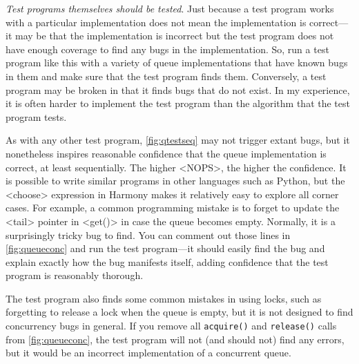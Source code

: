 \documentclass{report}
\begin{document}
\emph{Test programs themselves should be tested}.
Just because a test program works with a particular implementation
does not mean the implementation is correct---it may be that the implementation
is incorrect but the test program does not have enough coverage to find any
bugs in the implementation.
So, run a test program like this with a variety of queue implementations that
have known bugs in them and make sure that the test program finds them.
Conversely, a test program may be broken in that it finds bugs that do not exist.
In my experience, it is often harder to implement the test program than
the algorithm that the test program tests.

As with any other test program,
\autoref{fig:qtestseq} may not trigger extant bugs, but
it nonetheless inspires reasonable confidence that the
queue implementation is correct, at least sequentially.
The higher <{NOPS}>, the higher the confidence.
It is possible to write similar programs in other languages
such as Python, but the <{choose}> expression in Harmony
makes it relatively easy to explore all corner cases.
%
For example, a common programming mistake is to forget to
update the <{tail}> pointer in <{get()}> in case
the queue becomes empty.  Normally, it is a surprisingly
tricky bug to find.  You can comment out those lines
in \autoref{fig:queueconc} and run the test program---it should
easily find the bug and explain exactly how
the bug manifests itself, adding confidence that the test program
is reasonably thorough.

The test program also finds some common mistakes in using
locks, such as forgetting to release a lock when the queue
is empty, but it is not designed to find concurrency bugs
in general.  If you remove all \texttt{acquire()} and
\texttt{release()} calls from \autoref{fig:queueconc},
the test program will not (and should not)
find any errors, but it would be an incorrect implementation
of a concurrent queue.
\end{document}
